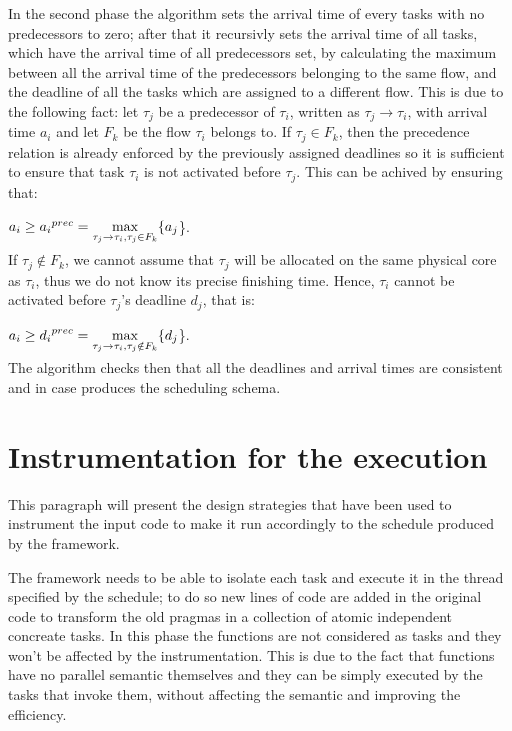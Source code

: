 \documentclass[a4paper,11pt,oneside]{book}
\begin{document}
In the second phase the algorithm sets the arrival time of every tasks with no predecessors to zero; after that it recursivly sets the arrival time of all tasks, which have the arrival time of all predecessors set, by calculating the maximum between all the arrival time of the predecessors belonging to the same flow, and the deadline of all the tasks which are assigned to a different flow. This is due to the following fact: let $\tau_j$ be a predecessor of $\tau_i$, written as $\tau_j \rightarrow \tau_i$, with arrival time $a_i$ and let $F_k$ be the flow $\tau_i$ belongs to. If $\tau_j \in F_k$, then the precedence relation is already enforced by the previously assigned deadlines so it is sufficient to ensure that task $\tau_i$ is not activated before $\tau_j$. This can be achived by ensuring that:
\begin{center}$ a_i \ge  {a_i}^{prec} = \smash{\displaystyle\max_{\tau_j \rightarrow \tau_i,\tau_j \in F_k} }\{a_j$\}.\end{center}
If $\tau_j \notin F_k$, we cannot assume that $\tau_j$ will be allocated on the same physical core as $\tau_i$, thus we do not know its precise finishing time. Hence, $\tau_i$ cannot be activated before $\tau_j$'s deadline $d_j$, that is:
\begin{center}$ a_i \ge  {d_i}^{prec} = \smash{\displaystyle\max_{\tau_j \rightarrow \tau_i,\tau_j \notin F_k} }\{d_j$\}.\end{center}
The algorithm checks then that all the deadlines and arrival times are consistent and in case produces the scheduling schema.

\section{Instrumentation for the execution}
\label{designexecution}

This paragraph will present the design strategies that have been used to instrument the input code to make it run accordingly to the schedule produced by the framework. 

The framework needs to be able to isolate each task and execute it in the thread specified by the schedule; to do so new lines of code are added in the original code to transform the old pragmas in a collection of atomic independent concreate tasks. In this phase the functions are not considered as tasks and they won’t be affected by the instrumentation. This is due to the fact that functions have no parallel semantic themselves and they can be simply executed by the tasks that invoke them, without affecting the semantic and improving the efficiency.
\end{document}

